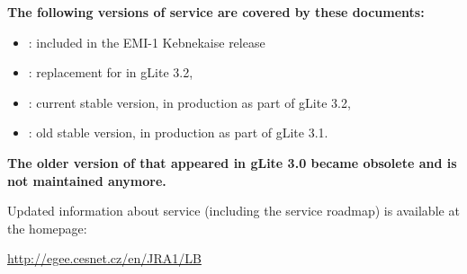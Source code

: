 \textbf{The following versions of \LB service are covered by these documents:}
\begin{itemize}
\item {}: included in the EMI-1 Kebnekaise release
\item {}: replacement for  in gLite 3.2,
\item {}: current stable version, in production as part of gLite 3.2,
\item {}: old stable version, in production as part of gLite 3.1.
\end{itemize}
\textbf{The older version of \LB that appeared in gLite 3.0 became obsolete and is not maintained anymore.}


Updated information about \LB service (including the \LB service roadmap) is available at the
\LB homepage:
\begin{center}
\href{http://egee.cesnet.cz/en/JRA1/LB}{http://egee.cesnet.cz/en/JRA1/LB}
\end{center}

